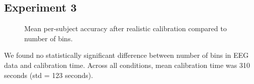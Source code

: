 \subsection{Experiment 3}

\begin{figure}[!h]
  \vspace{-0.2cm}
  \centering
   {}
  \caption{Mean per-subject accuracy after realistic calibration compared to number of bins.}
  \label{fig:fig3}
  \vspace{-0.1cm}
\end{figure}

We found no statistically significant difference between number of bins in EEG data and calibration time. Across all conditions, mean calibration time was 310 seconds (std = 123 seconds).